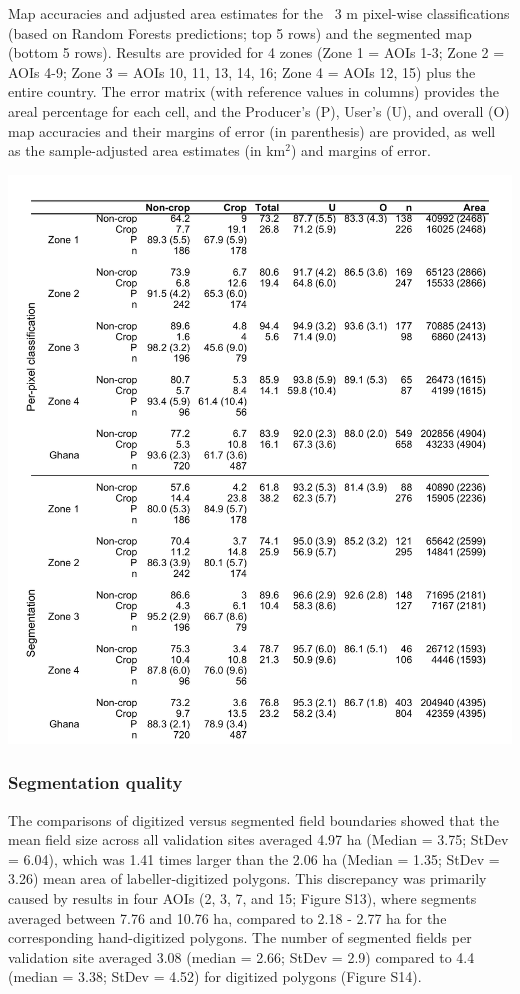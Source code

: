 \documentclass[11pt,a4paper]{article}
\begin{document}
\begin{table}
\caption{Map accuracies and adjusted area estimates for the ~3 m pixel-wise classifications (based on Random Forests predictions; top 5 rows) and the segmented map (bottom 5 rows). Results are provided for 4 zones (Zone 1 = AOIs 1-3; Zone 2 = AOIs 4-9; Zone 3 = AOIs 10, 11, 13, 14, 16; Zone 4 = AOIs 12, 15) plus the entire country. The error matrix (with reference values in columns) provides the areal percentage for each cell, and the Producer's (P), User's (U), and overall (O) map accuracies and their margins of error (in parenthesis) are provided, as well as the sample-adjusted area estimates (in km$^{2}$) and margins of error. }
\includegraphics[width = 18cm]{figures/table2.png}
\label{tab:mapaccuracy}
\end{table}

\hypertarget{segmentation-quality}{%
\subsubsection{Segmentation quality}\label{segmentation-quality}}

The comparisons of digitized versus segmented field boundaries showed
that the mean field size across all validation sites averaged 4.97 ha
(Median = 3.75; StDev = 6.04), which was 1.41 times larger than the 2.06
ha (Median = 1.35; StDev = 3.26) mean area of labeller-digitized
polygons. This discrepancy was primarily caused by results in four AOIs
(2, 3, 7, and 15; Figure S13), where segments averaged between 7.76 and
10.76 ha, compared to 2.18 - 2.77 ha for the corresponding
hand-digitized polygons. The number of segmented fields per validation
site averaged 3.08 (median = 2.66; StDev = 2.9) compared to 4.4 (median
= 3.38; StDev = 4.52) for digitized polygons (Figure S14).
\end{document}
